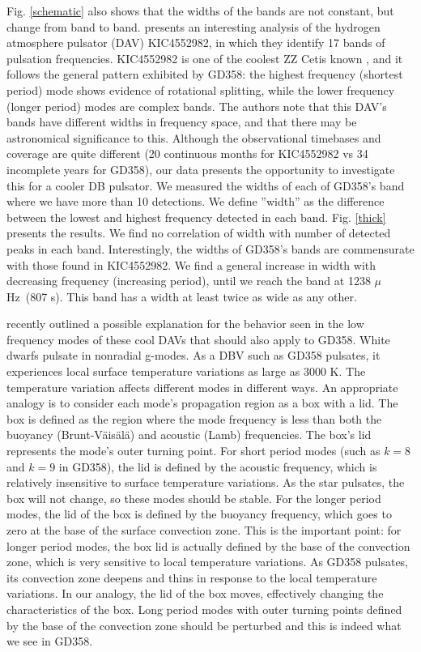 \documentclass[12pt,preprint]{aastex}
\newcommand{\muHz}{\mbox{$\mu$Hz}}
\begin{document}
Fig. \ref{schematic} also shows that the widths of the bands are not constant, but change 
from band to band. \citet{Bell15} presents an interesting analysis of the hydrogen atmosphere pulsator 
(DAV) KIC4552982, in which they identify 17 bands of pulsation frequencies. KIC4552982 is one of the 
coolest ZZ Cetis known \citep{Tremblay2013}, and it follows the general pattern exhibited 
by GD358: the highest frequency (shortest period) mode shows evidence of rotational splitting, while the 
lower frequency (longer period) modes are complex bands. The authors note that this DAV's bands have 
different widths in frequency space, and that there may be astronomical significance to this. 
Although the observational timebases and coverage are quite different (20 continuous months 
for KIC4552982 vs 34 incomplete years for GD358), our data presents the opportunity to investigate this 
for a cooler DB pulsator.  We measured the widths of each of GD358's band where we have
more than 10 detections. We define ''width'' as the difference between the lowest and highest frequency 
detected in each band. Fig. \ref{thick} presents the results. We find no correlation of width with number
of detected peaks in each band. Interestingly, the widths of GD358's bands are commensurate with those 
found in KIC4552982. We find a general increase in width with decreasing frequency (increasing period), 
until we reach the band at 1238 \muHz\ (807 s). This band has a width at least twice as wide as any other. 

\citet{Mont2016} recently outlined a possible explanation for the behavior seen in the low frequency modes
of these cool DAVs that should also apply to GD358. White dwarfs pulsate in nonradial g-modes. As a DBV such as 
GD358 pulsates, it experiences local surface temperature variations as large as 3000 K.  The temperature 
variation affects different modes in different ways.  An appropriate analogy is to consider each mode's 
propagation region as a box with a lid. The box is defined as the region where the mode frequency is 
less than both the buoyancy (Brunt-V{\"a}is{\"a}l{\"a}) and acoustic (Lamb) frequencies.  The box's lid 
represents the mode's outer turning point. For short period modes (such as $k=8$ and $k=9$ in GD358), the 
lid is defined by the acoustic frequency, which is relatively insensitive to surface temperature variations. 
As the star pulsates, the box will not change, so these modes should be stable.  For the longer period modes, 
the lid of the box is defined by the buoyancy frequency, which goes to zero at the base of the surface 
convection zone. This is the important point: for longer period modes, the box lid
is actually defined by the base of the convection zone, which is very sensitive to local temperature variations.  
As GD358 pulsates, its convection zone deepens and thins in response to the local temperature variations. 
In our analogy, the lid of the box moves, effectively changing the characteristics of the box. Long period modes with 
outer turning points defined by the base of the convection zone should be perturbed and this is indeed 
what we see in GD358. 
\end{document}
